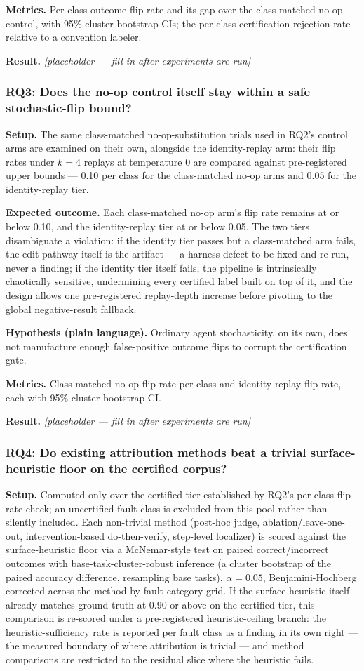 \documentclass[11pt]{article}
\newcommand{\ph}{\textit{[placeholder --- fill in after experiments are run]}}
\begin{document}
\textbf{Metrics.} Per-class outcome-flip rate and its gap over the class-matched no-op control, with 95\% cluster-bootstrap CIs; the per-class certification-rejection rate relative to a convention labeler.

\textbf{Result.} \ph

\subsubsection{RQ3: Does the no-op control itself stay within a safe stochastic-flip bound?}
\textbf{Setup.} The same class-matched no-op-substitution trials used in RQ2's control arms are examined on their own, alongside the identity-replay arm: their flip rates under $k = 4$ replays at temperature 0 are compared against pre-registered upper bounds --- 0.10 per class for the class-matched no-op arms and 0.05 for the identity-replay tier.

\textbf{Expected outcome.} Each class-matched no-op arm's flip rate remains at or below 0.10, and the identity-replay tier at or below 0.05. The two tiers disambiguate a violation: if the identity tier passes but a class-matched arm fails, the edit pathway itself is the artifact --- a harness defect to be fixed and re-run, never a finding; if the identity tier itself fails, the pipeline is intrinsically chaotically sensitive, undermining every certified label built on top of it, and the design allows one pre-registered replay-depth increase before pivoting to the global negative-result fallback.

\textbf{Hypothesis (plain language).} Ordinary agent stochasticity, on its own, does not manufacture enough false-positive outcome flips to corrupt the certification gate.

\textbf{Metrics.} Class-matched no-op flip rate per class and identity-replay flip rate, each with 95\% cluster-bootstrap CI.

\textbf{Result.} \ph

\subsubsection{RQ4: Do existing attribution methods beat a trivial surface-heuristic floor on the certified corpus?}
\textbf{Setup.} Computed only over the certified tier established by RQ2's per-class flip-rate check; an uncertified fault class is excluded from this pool rather than silently included. Each non-trivial method (post-hoc judge, ablation/leave-one-out, intervention-based do-then-verify, step-level localizer) is scored against the surface-heuristic floor via a McNemar-style test on paired correct/incorrect outcomes with base-task-cluster-robust inference (a cluster bootstrap of the paired accuracy difference, resampling base tasks), $\alpha = 0.05$, Benjamini-Hochberg corrected across the method-by-fault-category grid. If the surface heuristic itself already matches ground truth at 0.90 or above on the certified tier, this comparison is re-scored under a pre-registered heuristic-ceiling branch: the heuristic-sufficiency rate is reported per fault class as a finding in its own right --- the measured boundary of where attribution is trivial --- and method comparisons are restricted to the residual slice where the heuristic fails.
\end{document}
